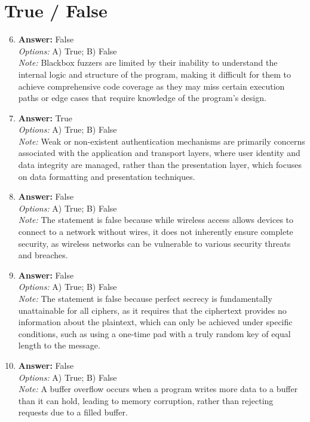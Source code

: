\documentclass[12pt]{article}
\begin{document}
\section*{True / False}
\begin{enumerate}[label=\arabic*.]
\setcounter{enumi}{5}
\item \textbf{Answer:} False
\\ \textit{Options:} A) True; B) False
\\ \textit{Note:} Blackbox fuzzers are limited by their inability to understand the internal logic and structure of the program, making it difficult for them to achieve comprehensive code coverage as they may miss certain execution paths or edge cases that require knowledge of the program's design.
\item \textbf{Answer:} True
\\ \textit{Options:} A) True; B) False
\\ \textit{Note:} Weak or non-existent authentication mechanisms are primarily concerns associated with the application and transport layers, where user identity and data integrity are managed, rather than the presentation layer, which focuses on data formatting and presentation techniques.
\item \textbf{Answer:} False
\\ \textit{Options:} A) True; B) False
\\ \textit{Note:} The statement is false because while wireless access allows devices to connect to a network without wires, it does not inherently ensure complete security, as wireless networks can be vulnerable to various security threats and breaches.
\item \textbf{Answer:} False
\\ \textit{Options:} A) True; B) False
\\ \textit{Note:} The statement is false because perfect secrecy is fundamentally unattainable for all ciphers, as it requires that the ciphertext provides no information about the plaintext, which can only be achieved under specific conditions, such as using a one-time pad with a truly random key of equal length to the message.
\item \textbf{Answer:} False
\\ \textit{Options:} A) True; B) False
\\ \textit{Note:} A buffer overflow occurs when a program writes more data to a buffer than it can hold, leading to memory corruption, rather than rejecting requests due to a filled buffer.
\end{enumerate}
\end{document}

